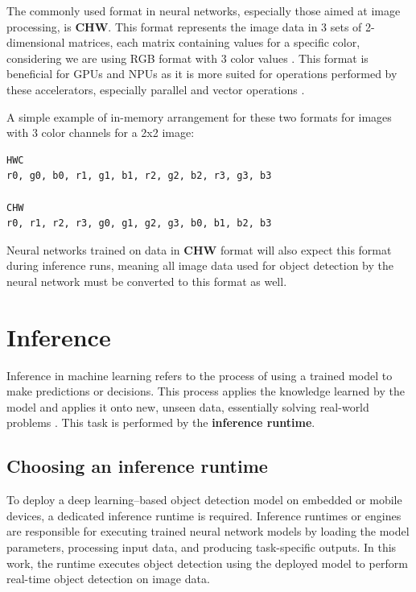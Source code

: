 The commonly used format in neural networks, especially those aimed at image processing, is \textbf{CHW}. This format represents the image data in 3 sets of 2-dimensional matrices, each matrix containing values for a specific color, considering we are using RGB format with 3 color values \cite{channelFormatsSynopsis}. This format is beneficial for GPUs and NPUs as it is more suited for operations performed by these accelerators, especially parallel and vector operations \cite{chwAndHwcFormats}. 

A simple example of in-memory arrangement for these two formats for images with 3 color channels for a 2x2 image:

\begin{verbatim}
HWC
r0, g0, b0, r1, g1, b1, r2, g2, b2, r3, g3, b3

CHW
r0, r1, r2, r3, g0, g1, g2, g3, b0, b1, b2, b3
\end{verbatim}

Neural networks trained on data in \textbf{CHW} format will also expect this format during inference runs, meaning all image data used for object detection by the neural network must be converted to this format as well.




\section{Inference}
Inference in machine learning refers to the process of using a trained model to make predictions or decisions. This process applies the knowledge learned by the model and applies it onto new, unseen data, essentially solving real-world problems \cite{lenovoInference}. This task is performed by the \textbf{inference runtime}.

\subsection{Choosing an inference runtime}
\label{chosingInferenceRT}
To deploy a deep learning–based object detection model on embedded or mobile devices, a dedicated inference runtime is required. Inference runtimes or engines are responsible for executing trained neural network models by loading the model parameters, processing input data, and producing task-specific outputs. In this work, the runtime executes object detection using the deployed model to perform real-time object detection on image data.

